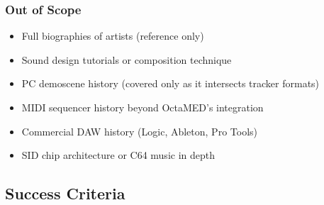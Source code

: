 \documentclass[11pt,letterpaper]{article}
\begin{document}
\subsubsection{Out of Scope}
\begin{itemize}[leftmargin=1.5em]
  \item Full biographies of artists (reference only)
  \item Sound design tutorials or composition technique
  \item PC demoscene history (covered only as it intersects tracker formats)
  \item MIDI sequencer history beyond OctaMED's integration
  \item Commercial DAW history (Logic, Ableton, Pro Tools)
  \item SID chip architecture or C64 music in depth
\end{itemize}

\subsection{Success Criteria}
\end{document}
